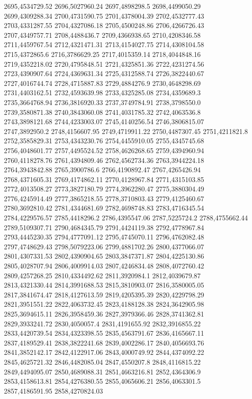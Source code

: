 2695,4534729.52
2696,5027960.24
2697,4898298.5
2698,4499050.29
2699,4309288.34
2700,4731590.75
2701,4378004.39
2702,4532777.43
2703,4331287.55
2704,4327086.18
2705,4500248.86
2706,4266726.43
2707,4349757.71
2708,4488436.7
2709,4366938.65
2710,4208346.58
2711,4459767.54
2712,4321471.31
2713,4154027.75
2714,4308104.58
2715,4372865.6
2716,3786629.25
2717,4015359.14
2718,4044848.16
2719,4352218.02
2720,4795848.51
2721,4325851.36
2722,4231274.56
2723,4390907.64
2724,4369631.34
2725,4312588.74
2726,3822440.67
2727,4016744.74
2728,4715887.83
2729,4884276.9
2730,4648298.69
2731,4403162.51
2732,4593639.98
2733,4325285.08
2734,4359689.3
2735,3664768.94
2736,3816920.33
2737,3749784.91
2738,3798550.0
2739,3580871.38
2740,3843060.08
2741,4031785.32
2742,4063536.8
2743,3898121.68
2744,4233003.07
2745,4140256.54
2746,3806815.07
2747,3892950.2
2748,4156607.95
2749,4719911.22
2750,4487307.45
2751,4211821.8
2752,3585829.31
2753,4343230.76
2754,4455910.05
2755,4345745.68
2756,4048601.77
2757,4495524.52
2758,4626268.65
2759,4394960.94
2760,4118278.76
2761,4394809.46
2762,4562734.36
2763,3944224.18
2764,3943842.88
2765,3900786.6
2766,4190892.47
2767,4265426.94
2768,4371605.31
2769,4174862.11
2770,4128967.84
2771,4315103.85
2772,4013508.27
2773,3827180.79
2774,3962280.47
2775,3880304.49
2776,4245914.49
2777,3865218.55
2778,3710803.43
2779,4125460.67
2780,3692810.42
2781,4344681.69
2782,4698748.83
2783,4716345.54
2784,4229576.57
2785,4418296.2
2786,4395547.06
2787,5225724.2
2788,4755662.44
2789,5109307.71
2790,4684345.79
2791,4424119.38
2792,4778967.84
2793,4445230.35
2794,4777091.12
2795,4745070.11
2796,4762082.48
2797,4748629.43
2798,5079223.06
2799,4881702.26
2800,4377066.07
2801,4307331.53
2802,4390904.65
2803,3847371.87
2804,4225130.86
2805,4028707.94
2806,4009914.03
2807,4246834.48
2808,4072760.42
2809,4257268.25
2810,4334492.62
2811,3920984.1
2812,4039679.87
2813,4321330.44
2814,3991688.53
2815,3810903.07
2816,3580005.05
2817,3841674.47
2818,4127613.59
2819,4205395.39
2820,4229798.29
2821,3951551.22
2822,4063732.45
2823,4188128.38
2824,3642905.98
2825,3694615.11
2826,3958459.36
2827,3979366.46
2828,3741362.81
2829,3933241.72
2830,4050057.4
2831,4191655.92
2832,3916855.22
2833,4420739.54
2834,4323398.55
2835,4563791.67
2836,4165667.11
2837,4189529.41
2838,3822241.68
2839,4002286.17
2840,4056693.76
2841,3852142.17
2842,4122917.06
2843,4000749.92
2844,4374092.22
2845,4625721.32
2846,4482085.04
2847,4550207.8
2848,4116815.22
2849,4494095.07
2850,4689088.31
2851,4663216.81
2852,4364306.9
2853,4158613.81
2854,4276380.55
2855,4065606.21
2856,4063301.5
2857,4186591.95
2858,4270824.03
